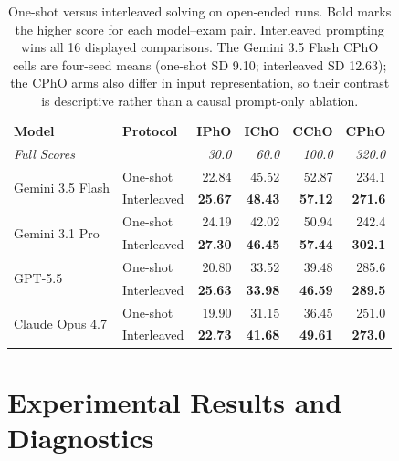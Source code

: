 \documentclass[11pt]{article}
\begin{document}
\begin{table}[t]
\vspace{-0cm}
\centering
\scriptsize
\setlength{\tabcolsep}{5pt}
\renewcommand{\arraystretch}{1.08}
\begin{tabular}{l|l|r r r r}
\toprule
\textbf{Model} & \textbf{Protocol} & \textbf{IPhO} & \textbf{IChO} & \textbf{CChO} & \textbf{CPhO} \\
\multicolumn{2}{l}{\textit{Full Scores}} & \textit{30.0} & \textit{60.0} & \textit{100.0} & \textit{320.0} \\
\midrule
\multirow{2}{*}{Gemini 3.5 Flash}
  & One-shot & 22.84 & 45.52 & 52.87 & 234.1 \\
  & Interleaved & \textbf{25.67} & \textbf{48.43} & \textbf{57.12} & \textbf{271.6} \\
\midrule
\multirow{2}{*}{Gemini 3.1 Pro}
  & One-shot & 24.19 & 42.02 & 50.94 & 242.4 \\
  & Interleaved & \textbf{27.30} & \textbf{46.45} & \textbf{57.44} & \textbf{302.1} \\
\midrule
\multirow{2}{*}{GPT-5.5}
  & One-shot & 20.80 & 33.52 & 39.48 & 285.6 \\
  & Interleaved & \textbf{25.63} & \textbf{33.98} & \textbf{46.59} & \textbf{289.5} \\
\midrule
\multirow{2}{*}{Claude Opus 4.7}
  & One-shot & 19.90 & 31.15 & 36.45 & 251.0 \\
  & Interleaved & \textbf{22.73} & \textbf{41.68} & \textbf{49.61} & \textbf{273.0} \\
\bottomrule
\end{tabular}
\vspace{-0.4em}
\caption{One-shot versus interleaved solving on open-ended runs. Bold marks the higher score for each model--exam pair. Interleaved prompting wins all 16 displayed comparisons. The Gemini 3.5 Flash CPhO cells are four-seed means (one-shot SD 9.10; interleaved SD 12.63); the CPhO arms also differ in input representation, so their contrast is descriptive rather than a causal prompt-only ablation.}
\label{tab:oneshot-interleaved-ablation}
\vspace{-0.4cm}
\end{table}




\section{Experimental Results and Diagnostics}
\label{sec:3}
\end{document}
